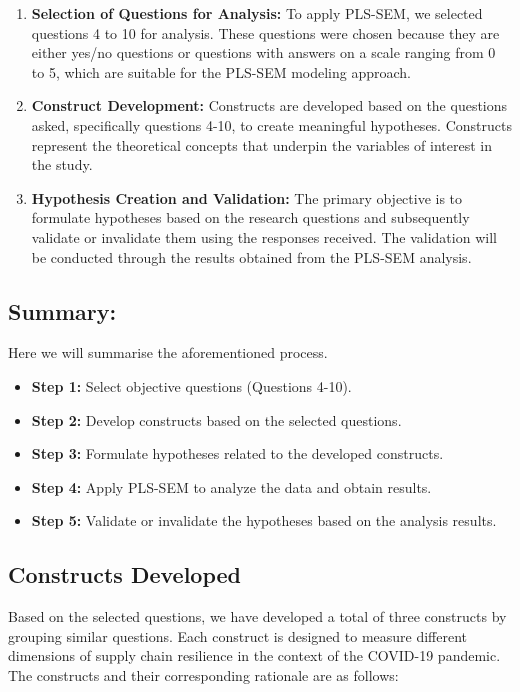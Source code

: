\begin{enumerate}

    \item \textbf{Selection of Questions for Analysis:} To apply PLS-SEM, we selected questions 4 to 10 for analysis. These questions were chosen because they are either yes/no questions or questions with answers on a scale ranging from 0 to 5, which are suitable for the PLS-SEM modeling approach.

    \item \textbf{Construct Development:} Constructs are developed based on the questions asked, specifically questions 4-10, to create meaningful hypotheses. Constructs represent the theoretical concepts that underpin the variables of interest in the study.

    \item \textbf{Hypothesis Creation and Validation:} The primary objective is to formulate hypotheses based on the research questions and subsequently validate or invalidate them using the responses received. The validation will be conducted through the results obtained from the PLS-SEM analysis.

\end{enumerate}


\subsection*{Summary:}
\noindent Here we will summarise the aforementioned process.

\begin{itemize}
    \item \textbf{Step 1:} Select objective questions (Questions 4-10).
    \item \textbf{Step 2:} Develop constructs based on the selected questions.
    \item \textbf{Step 3:} Formulate hypotheses related to the developed constructs.
    \item \textbf{Step 4:} Apply PLS-SEM to analyze the data and obtain results.
    \item \textbf{Step 5:} Validate or invalidate the hypotheses based on the analysis results.
\end{itemize}

\subsection{Constructs Developed}

Based on the selected questions, we have developed a total of three constructs by grouping similar questions. Each construct is designed to measure different dimensions of supply chain resilience in the context of the COVID-19 pandemic. The constructs and their corresponding rationale are as follows:

